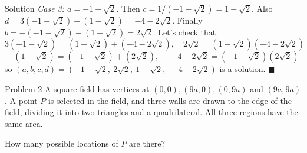 \documentclass{article}
\begin{document}
\begin{solution}{Solution}
\textit{Case 3: $a = -1 - \sqrt2$.} Then $c = 1/(-1-\sqrt2) = 1-\sqrt2$.
Also $d = 3(-1-\sqrt2) - (1-\sqrt2) = -4 - 2\sqrt2$. Finally
$b = -(-1-\sqrt2) - (1-\sqrt2) = 2\sqrt2$. Let's check that
$$
3(-1-\sqrt2) = (1-\sqrt2) + (-4 - 2\sqrt2), \quad
2\sqrt2 = (1-\sqrt2)(-4-2\sqrt2)
$$
$$
-(1-\sqrt2) = (-1-\sqrt2) + (2\sqrt2), \quad
-4-2\sqrt2 = (-1-\sqrt2)(2\sqrt2)
$$
so $(a,b,c,d) = (-1-\sqrt2, \ 2\sqrt2, \ 1-\sqrt2, \ -4-2\sqrt2)$
is a solution. $\blacksquare$
\end{solution}
\newpage

\begin{problem}{Problem 2}
A square field has vertices at $(0,0), (9a, 0), (0, 9a)$ and $(9a, 9a)$.
A point $P$ is selected in the field, and three walls are drawn to the
edge of the field, dividing it into two triangles and a quadrilateral.
All three regions have the same area.\vspace{0.2cm}

How many possible locations of $P$ are there?
\end{problem}
\end{document}
